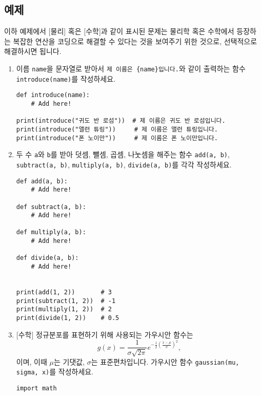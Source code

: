 \documentclass[../main.tex]{subfiles}
\begin{document}
\subsection{예제}
이하 예제에서 \textsf{[물리]} 혹은 \textsf{[수학]}과 같이 표시된 문제는 물리학
혹은 수학에서 등장하는 복잡한 연산을 코딩으로 해결할 수 있다는 것을 보여주기
위한 것으로, 선택적으로 해결하시면 됩니다.
\begin{enumerate}
  \item 이름 \verb|name|을 문자열로 받아서 \verb|제 이름은 {name}입니다.|와 같이
    출력하는 함수 \verb|introduce(name)|를 작성하세요.
\begin{verbatim}
def introduce(name):
    # Add here!

print(introduce("귀도 반 로섬"))  # 제 이름은 귀도 반 로섬입니다.
print(introduce("앨런 튜링"))     # 제 이름은 앨런 튜링입니다.
print(introduce("폰 노이만"))     # 제 이름은 폰 노이만입니다.
\end{verbatim}

  \item 두 수 \verb|a|와 \verb|b|를 받아 덧셈, 뺄셈, 곱셈, 나눗셈을 해주는 함수
    \verb|add(a, b)|, \verb|subtract(a, b)|, \verb|multiply(a, b)|,
    \verb|divide(a, b)|를 각각 작성하세요.

\begin{verbatim}
def add(a, b):
    # Add here!

def subtract(a, b):
    # Add here!

def multiply(a, b):
    # Add here!

def divide(a, b):
    # Add here!


print(add(1, 2))       # 3
print(subtract(1, 2))  # -1
print(multiply(1, 2))  # 2
print(divide(1, 2))    # 0.5
\end{verbatim}

  \item \textsf{[수학]} 정규분포를 표현하기 위해 사용되는 가우시안 함수는
    \[
    g(x) = \frac{1}{\sigma \sqrt{2\pi}} e^{-\frac12 \left(\frac{x - \mu}{\sigma}\right)^2},
    \]
    이며, 이때 $\mu$는 기댓값, $\sigma$는 표준편차입니다.
    가우시안 함수 \verb|gaussian(mu, sigma, x)|를 작성하세요.
\begin{verbatim}
import math


\end{verbatim}
\end{enumerate}
\end{document}
